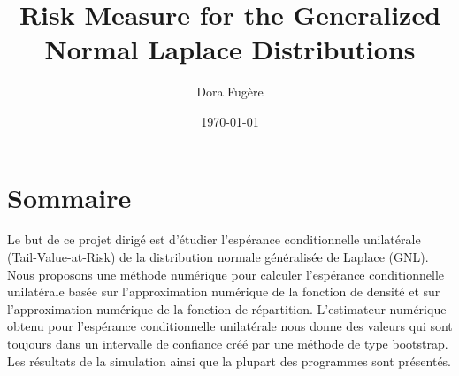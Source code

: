 \documentclass[12pt,travaildirige,nobabel, twoside]{dms}
\numberwithin{equation}{section}
\numberwithin{table}{chapter}
\numberwithin{figure}{chapter}
\begin{document}



\title{Risk Measure for the Generalized Normal Laplace Distributions }
\author{Dora Fugère}
\date{\today}									%


\maketitle    
 


\chapter*{Sommaire} 	%

Le but de ce projet dirigé est d'étudier l'espérance conditionnelle unilatérale (Tail-Value-at-Risk) de la distribution normale généralisée de Laplace (GNL).
Nous proposons une méthode numérique pour calculer l'espérance conditionnelle unilatérale basée sur l'approximation numérique de la fonction de densité et  sur l'approximation numérique de la fonction de répartition.
L'estimateur numérique obtenu pour l'espérance conditionnelle unilatérale nous donne des valeurs qui sont toujours dans un intervalle de confiance créé par une méthode de type bootstrap.
Les résultats de la simulation ainsi que la plupart des programmes sont présentés.\\
\end{document}
